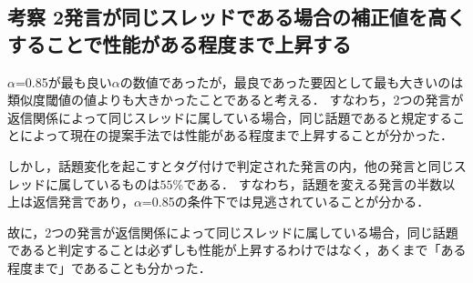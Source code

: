 \subsection*{考察 2発言が同じスレッドである場合の補正値を高くすることで性能がある程度まで上昇する}
$\alpha$=0.85が最も良い$\alpha$の数値であったが，最良であった要因として最も大きいのは類似度閾値の値よりも大きかったことであると考える．
すなわち，2つの発言が返信関係によって同じスレッドに属している場合，同じ話題であると規定することによって現在の提案手法では性能がある程度まで上昇することが分かった．

しかし，話題変化を起こすとタグ付けで判定された発言の内，他の発言と同じスレッドに属しているものは$55$\%である．
すなわち，話題を変える発言の半数以上は返信発言であり，$\alpha$=0.85の条件下では見逃されていることが分かる．

故に，2つの発言が返信関係によって同じスレッドに属している場合，同じ話題であると判定することは必ずしも性能が上昇するわけではなく，あくまで「ある程度まで」であることも分かった．

